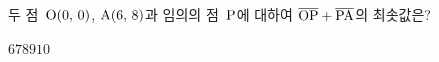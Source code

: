 두 점~$\mathrm{O}(0,\mkern3mu 0)$, $\mathrm{A}(6,\mkern3mu 8)$과 임의의 점~$\mathrm{P}$에 대하여 $\overline{\mathrm{OP}}+\overline{\mathrm{PA}}$의 최솟값은?
\begin{choices32}{$6$}{$7$}{$8$}{$9$}{$10$}\end{choices32}
